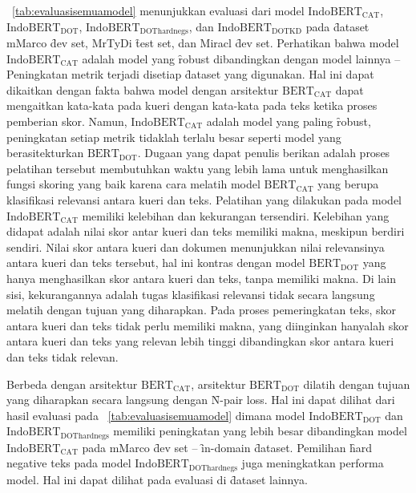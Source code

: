 \tab~\ref{tab:evaluasisemuamodel} menunjukkan evaluasi dari model $\text{IndoBERT}_{\text{CAT}}$, $\text{IndoBERT}_{\text{DOT}}$, $\text{IndoBERT}_{\text{DOThardnegs}}$, dan $\text{IndoBERT}_{\text{DOTKD}}$ pada \f{dataset} mMarco \f{dev set}, MrTyDi \f{test set}, dan Miracl \f{dev set}. Perhatikan bahwa model $\text{IndoBERT}_{\text{CAT}}$ adalah model yang \f{robust} dibandingkan dengan model lainnya -- Peningkatan metrik terjadi disetiap \f{dataset} yang digunakan. Hal ini dapat dikaitkan dengan fakta bahwa model dengan arsitektur $\text{BERT}_{\text{CAT}}$ dapat mengaitkan kata-kata pada kueri dengan kata-kata pada teks ketika proses pemberian skor. Namun, $\text{IndoBERT}_{\text{CAT}}$ adalah model yang paling \f{robust}, peningkatan setiap metrik tidaklah terlalu besar seperti model yang berasitekturkan $\text{BERT}_{\text{DOT}}$. Dugaan yang dapat penulis berikan adalah proses pelatihan tersebut membutuhkan waktu yang lebih lama untuk menghasilkan fungsi skoring yang baik karena cara melatih model $\text{BERT}_{\text{CAT}}$ yang berupa klasifikasi relevansi antara kueri dan teks. Pelatihan yang dilakukan pada model $\text{IndoBERT}_{\text{CAT}}$ memiliki kelebihan dan kekurangan tersendiri. Kelebihan yang didapat adalah nilai skor antar kueri dan teks memiliki makna, meskipun berdiri sendiri. Nilai skor antara kueri dan dokumen menunjukkan nilai relevansinya antara kueri dan teks tersebut, hal ini kontras dengan model $\text{BERT}_{\text{DOT}}$ yang hanya menghasilkan skor antara kueri dan teks, tanpa memiliki makna. Di lain sisi, kekurangannya adalah tugas klasifikasi relevansi tidak secara langsung melatih dengan tujuan yang diharapkan. Pada proses pemeringkatan teks, skor antara kueri dan teks tidak perlu memiliki makna, yang diinginkan hanyalah skor antara kueri dan teks yang relevan lebih tinggi dibandingkan skor antara kueri dan teks tidak relevan. 

Berbeda dengan arsitektur $\text{BERT}_{\text{CAT}}$, arsitektur $\text{BERT}_{\text{DOT}}$ dilatih dengan tujuan yang diharapkan secara langsung dengan \f{N-pair loss}. Hal ini dapat dilihat dari hasil evaluasi pada \tab~\ref{tab:evaluasisemuamodel} dimana model $\text{IndoBERT}_{\text{DOT}}$ dan $\text{IndoBERT}_{\text{DOThardnegs}}$ memiliki peningkatan yang lebih besar dibandingkan model $\text{IndoBERT}_{\text{CAT}}$ pada mMarco \f{dev set} -- \f{in-domain} \f{dataset}. Pemilihan \f{hard negative} teks pada model $\text{IndoBERT}_{\text{DOThardnegs}}$ juga meningkatkan performa model. Hal ini dapat dilihat pada evaluasi di \f{dataset} lainnya.

